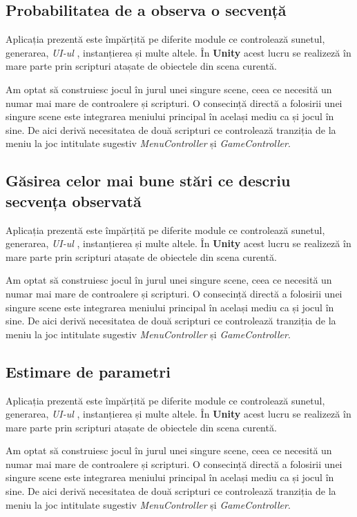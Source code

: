 \subsection{Probabilitatea de a observa o secvență}
Aplicația prezentă este împărțită pe diferite module ce controlează sunetul, generarea, \textit{UI-ul} , instanțierea și multe altele. În \textbf{Unity} acest lucru se realizeză în mare parte prin scripturi atașate de obiectele din scena curentă. \par
Am optat să construiesc jocul în jurul unei singure scene, ceea ce necesită un numar mai mare de controalere și scripturi. O consecință directă a folosirii unei singure scene este integrarea meniului principal în același mediu ca și jocul în sine. De aici derivă necesitatea de două scripturi ce controlează tranziția de la meniu la joc intitulate sugestiv \textit{MenuController} și \textit{GameController}.\par

\subsection{Găsirea celor mai bune stări ce descriu secvența observată}
Aplicația prezentă este împărțită pe diferite module ce controlează sunetul, generarea, \textit{UI-ul} , instanțierea și multe altele. În \textbf{Unity} acest lucru se realizeză în mare parte prin scripturi atașate de obiectele din scena curentă. \par
Am optat să construiesc jocul în jurul unei singure scene, ceea ce necesită un numar mai mare de controalere și scripturi. O consecință directă a folosirii unei singure scene este integrarea meniului principal în același mediu ca și jocul în sine. De aici derivă necesitatea de două scripturi ce controlează tranziția de la meniu la joc intitulate sugestiv \textit{MenuController} și \textit{GameController}.\par

\subsection{Estimare de parametri}
Aplicația prezentă este împărțită pe diferite module ce controlează sunetul, generarea, \textit{UI-ul} , instanțierea și multe altele. În \textbf{Unity} acest lucru se realizeză în mare parte prin scripturi atașate de obiectele din scena curentă. \par
Am optat să construiesc jocul în jurul unei singure scene, ceea ce necesită un numar mai mare de controalere și scripturi. O consecință directă a folosirii unei singure scene este integrarea meniului principal în același mediu ca și jocul în sine. De aici derivă necesitatea de două scripturi ce controlează tranziția de la meniu la joc intitulate sugestiv \textit{MenuController} și \textit{GameController}.\par


